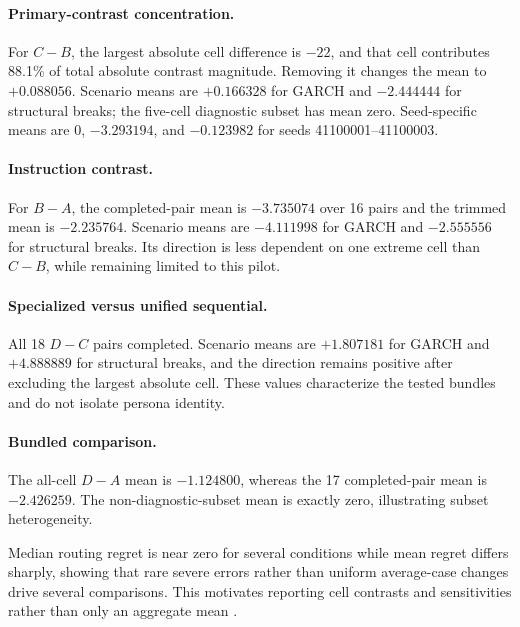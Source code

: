 \paragraph{Primary-contrast concentration.}
For \(C-B\), the largest absolute cell difference is \(-22\), and that cell
contributes 88.1\% of total absolute contrast magnitude.  Removing it changes
the mean to \(+0.088056\).  Scenario means are \(+0.166328\) for GARCH and
\(-2.444444\) for structural breaks; the five-cell diagnostic subset has mean
zero.  Seed-specific means are \(0\), \(-3.293194\), and \(-0.123982\) for
seeds 41100001--41100003.

\paragraph{Instruction contrast.}
For \(B-A\), the completed-pair mean is \(-3.735074\) over 16 pairs and the
trimmed mean is \(-2.235764\).  Scenario means are \(-4.111998\) for GARCH and
\(-2.555556\) for structural breaks.  Its direction is less dependent on one
extreme cell than \(C-B\), while remaining limited to this pilot.

\paragraph{Specialized versus unified sequential.}
All 18 \(D-C\) pairs completed.  Scenario means are \(+1.807181\) for GARCH
and \(+4.888889\) for structural breaks, and the direction remains positive
after excluding the largest absolute cell.  These values characterize the
tested bundles and do not isolate persona identity.

\paragraph{Bundled comparison.}
The all-cell \(D-A\) mean is \(-1.124800\), whereas the 17 completed-pair mean
is \(-2.426259\).  The non-diagnostic-subset mean is exactly zero,
illustrating subset heterogeneity.

Median routing regret is near zero for several conditions while mean regret
differs sharply, showing that rare severe errors rather than uniform
average-case changes drive several comparisons.  This motivates reporting
cell contrasts and sensitivities rather than only an aggregate mean
\citep{ZhaiEtAl2021CVaR}.
